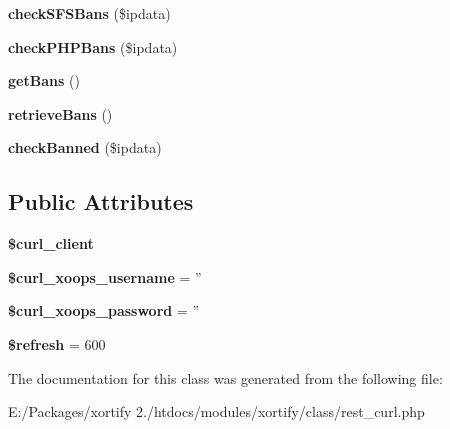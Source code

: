 \begin{DoxyCompactItemize}
\item 
\hypertarget{class_r_e_s_t___c_u_r_l_xortify_exchange_a01d982cf70a2ac0ff8c123df81cda452}{{\bfseries check\-S\-F\-S\-Bans} (\$ipdata)}\label{class_r_e_s_t___c_u_r_l_xortify_exchange_a01d982cf70a2ac0ff8c123df81cda452}

\item 
\hypertarget{class_r_e_s_t___c_u_r_l_xortify_exchange_ab4fda0a7d8d884f7bc09cd65c9ac28f8}{{\bfseries check\-P\-H\-P\-Bans} (\$ipdata)}\label{class_r_e_s_t___c_u_r_l_xortify_exchange_ab4fda0a7d8d884f7bc09cd65c9ac28f8}

\item 
\hypertarget{class_r_e_s_t___c_u_r_l_xortify_exchange_a65e828e7424e3d4ab1a8d470b7b58cc4}{{\bfseries get\-Bans} ()}\label{class_r_e_s_t___c_u_r_l_xortify_exchange_a65e828e7424e3d4ab1a8d470b7b58cc4}

\item 
\hypertarget{class_r_e_s_t___c_u_r_l_xortify_exchange_a5f580a21abfbbe9acc0e8839c3b65bbe}{{\bfseries retrieve\-Bans} ()}\label{class_r_e_s_t___c_u_r_l_xortify_exchange_a5f580a21abfbbe9acc0e8839c3b65bbe}

\item 
\hypertarget{class_r_e_s_t___c_u_r_l_xortify_exchange_aef548f74191c3907685135d4e82c1f4d}{{\bfseries check\-Banned} (\$ipdata)}\label{class_r_e_s_t___c_u_r_l_xortify_exchange_aef548f74191c3907685135d4e82c1f4d}

\end{DoxyCompactItemize}
\subsection*{Public Attributes}
\begin{DoxyCompactItemize}
\item 
\hypertarget{class_r_e_s_t___c_u_r_l_xortify_exchange_a49a84b937616a2a6ab188c926bd0bc0b}{{\bfseries \$curl\-\_\-client}}\label{class_r_e_s_t___c_u_r_l_xortify_exchange_a49a84b937616a2a6ab188c926bd0bc0b}

\item 
\hypertarget{class_r_e_s_t___c_u_r_l_xortify_exchange_adef13c1d635af3f4bd70cc84a3f21f1c}{{\bfseries \$curl\-\_\-xoops\-\_\-username} = ''}\label{class_r_e_s_t___c_u_r_l_xortify_exchange_adef13c1d635af3f4bd70cc84a3f21f1c}

\item 
\hypertarget{class_r_e_s_t___c_u_r_l_xortify_exchange_a2f97c105d275b8ed4479abb810497def}{{\bfseries \$curl\-\_\-xoops\-\_\-password} = ''}\label{class_r_e_s_t___c_u_r_l_xortify_exchange_a2f97c105d275b8ed4479abb810497def}

\item 
\hypertarget{class_r_e_s_t___c_u_r_l_xortify_exchange_a2abe4660e5d19ce2ce2631b312f8b6b8}{{\bfseries \$refresh} = 600}\label{class_r_e_s_t___c_u_r_l_xortify_exchange_a2abe4660e5d19ce2ce2631b312f8b6b8}

\end{DoxyCompactItemize}


The documentation for this class was generated from the following file\-:\begin{DoxyCompactItemize}
\item 
E\-:/\-Packages/xortify 2./htdocs/modules/xortify/class/rest\-\_\-curl.\-php\end{DoxyCompactItemize}
